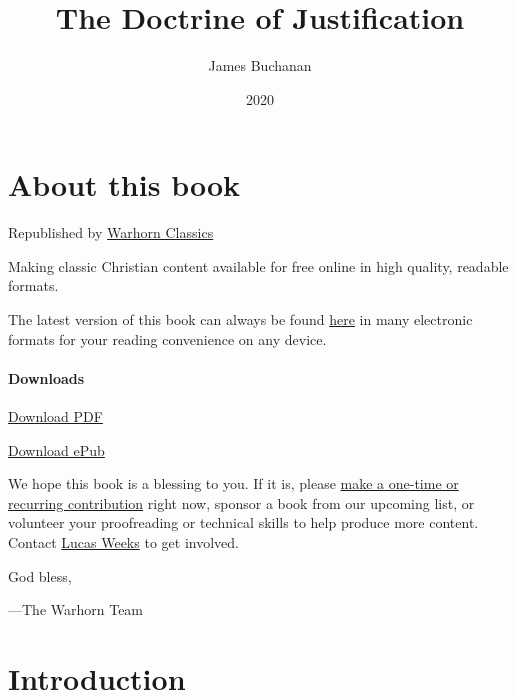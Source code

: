 \documentclass[
]{book}
\title{The Doctrine of Justification}
\author{James Buchanan}
\date{2020}
\begin{document}
\maketitle

\mainmatter
{}

{
\setcounter{tocdepth}{1}
\tableofcontents
}
\hypertarget{about-this-book}{%
\chapter*{About this book}\label{about-this-book}}

Republished by \href{https://classics.warhornmedia.com/}{Warhorn Classics}

Making classic Christian content available for free online in high quality, readable formats.

The latest version of this book can always be found \href{https://warhornmedia.github.io/warhorn-classics-book-template/}{here} in many electronic formats for your reading convenience on any device.

\hypertarget{downloads}{%
\subsubsection*{Downloads}\label{downloads}}

\href{https://warhornmedia.github.io/warhorn-classics-book-template//Buchanan-The_Doctrine_of_Justification.pdf}{Download PDF}

\href{https://warhornmedia.github.io/warhorn-classics-book-template//Buchanan-The_Doctrine_of_Justification.epub}{Download ePub}

We hope this book is a blessing to you. If it is, please \href{https://warhornmedia.com/give}{make a one-time or recurring contribution} right now, sponsor a book from our upcoming list, or volunteer your proofreading or technical skills to help produce more content. Contact \href{mailto:lucas@beggarsborn.com}{Lucas Weeks} to get involved.

God bless,

---The Warhorn Team

\clearpage
\setcounter{page}{1}

\hypertarget{introduction}{%
\chapter{Introduction}\label{introduction}}
\end{document}
